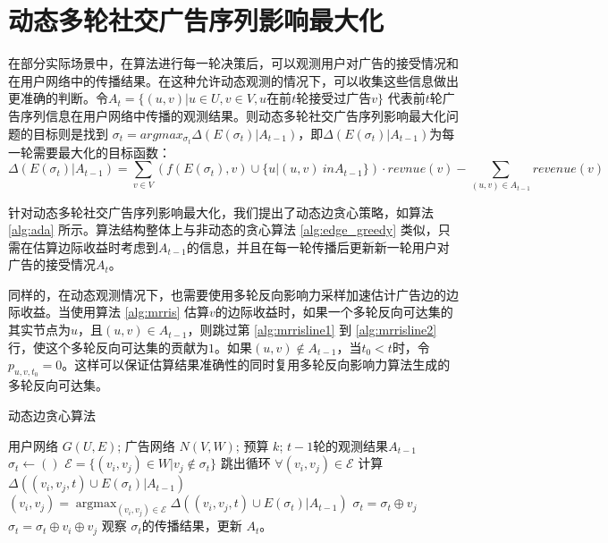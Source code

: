 \section{动态多轮社交广告序列影响最大化}
\label{sec:ada}

在部分实际场景中，在算法进行每一轮决策后，可以观测用户对广告的接受情况和在用户网络中的传播结果。在这种允许动态观测的情况下，可以收集这些信息做出更准确的判断。令$ A_t = \{(u,v) |  u \in U, v \in V ,u \text{在前}t\text{轮接受过广告}v\} $ 代表前$t$轮广告序列信息在用户网络中传播的观测结果。则动态多轮社交广告序列影响最大化问题的目标则是找到 $\sigma_t = arg max_{\sigma_t} \Delta(E(\sigma_t) | A_{t-1})$，即$\Delta(E(\sigma_t) | A_{t-1})$为每一轮需要最大化的目标函数：
\begin{equation}
    \Delta(E(\sigma_t) | A_{t-1}) = \sum_{v \in V} ( f(E(\sigma_t), v) \cup \{u | (u,v) \ in A_{t-1}\}) \cdot revnue(v) - \sum_{(u,v) \in A_{t-1}} revenue(v) 
\end{equation}

针对动态多轮社交广告序列影响最大化，我们提出了动态边贪心策略，如算法 \ref{alg:ada} 所示。算法结构整体上与非动态的贪心算法 \ref{alg:edge_greedy} 类似，只需在估算边际收益时考虑到$A_{t-1}$的信息，并且在每一轮传播后更新新一轮用户对广告的接受情况$A_{t}$。

同样的，在动态观测情况下，也需要使用多轮反向影响力采样加速估计广告边的边际收益。当使用算法 \ref{alg:mrris} 估算$v$的边际收益时，如果一个多轮反向可达集的其实节点为$u$，且$(u,v) \in A_{t-1}$，则跳过第 \ref{alg:mrrisline1} 到 \ref{alg:mrrisline2} 行，使这个多轮反向可达集的贡献为$1$。如果$(u,v) \notin A_{t-1}$，当$t_0 < t$时，令$p_{u,v,t_0} = 0$。这样可以保证估算结果准确性的同时复用多轮反向影响力算法生成的多轮反向可达集。

\begin{algorithm}[H]
    \caption{动态边贪心算法\label{alg:ada}}
    \begin{algorithmic}[1]
        \REQUIRE 用户网络 $G(U,E)$; 广告网络 $N(V,W)$; 预算 $k$; $t-1$轮的观测结果$A_{t - 1}$
        \STATE \(\sigma_t \gets ( )\)
            \STATE \(\mathcal{E} = \{(v_i,v_j) \in W | v_j \notin \sigma_t \}\)
                \STATE 跳出循环
            \ENDIF
            \STATE \(\forall (v_i,v_j) \in \mathcal{E}\) 计算 $\Delta({(v_i,v_j,t)} \cup E(\sigma_t)|A_{t-1})$
            \STATE \((v_i,v_j) = \mathop{\arg\max}_{(v_i,v_j) \in \mathcal{E}}\Delta({(v_i,v_j,t)} \cup E(\sigma_t)|A_{t-1}) \)
                \STATE \(\sigma_t = \sigma_t \oplus v_j\)
            \ELSE
                \STATE \(\sigma_t = \sigma_t \oplus v_i \oplus v_j\) 
            \ENDIF
        \ENDWHILE
        \STATE 观察 $\sigma_t$的传播结果，更新 $A_t$。
    \end{algorithmic}
\end{algorithm}

